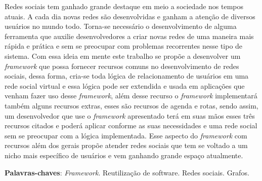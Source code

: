 \begin{resumo}

Redes sociais tem ganhado grande destaque em meio a sociedade nos tempos atuais. A cada dia novas redes são desenvolvidas e ganham a atenção de diversos usuários no mundo todo. Torna-se necessário o desenvolvimento de alguma ferramenta que auxilie desenvolvedores a criar novas redes de uma maneira mais rápida e prática e sem se preocupar com problemas recorrentes nesse tipo de sistema. Com essa ideia em mente este trabalho se propõe a desenvolver um \textit{framework} que possa fornecer recursos comuns no desenvolvimento de redes sociais, dessa forma, cria-se toda lógica de relacionamento de usuários em uma rede social virtual e essa lógica pode ser extendida e usada em aplicações que venham fazer uso desse \textit{framework}, além desse recurso o \textit{framework} implementará também alguns recursos extras, esses são recursos de agenda e rotas, sendo assim, um desenvolvedor que use o \textit{framework} apresentado terá em suas mãos esses três recursos citados e poderá aplicar conforme as suas necessidades e uma rede social sem se preocupar com a lógica implementada. Esse aspecto do \textit{framework} com recursos além dos gerais propõe atender redes sociais que tem se voltado a um nicho mais específico de usuários e vem ganhando grande espaço atualmente.

 \vspace{\onelineskip}
    
 \noindent
 \textbf{Palavras-chaves}: \textit{Framework}. Reutilização de software. Redes sociais. Grafos.
\end{resumo}
